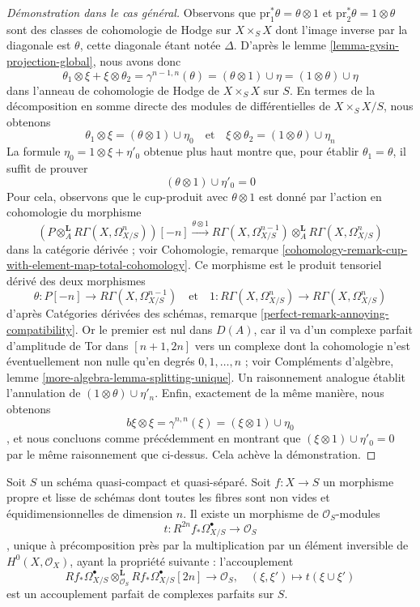 \begin{proof}[Démonstration dans le cas général]
\medskip\noindent
Observons que $\text{pr}_1^*\theta = \theta \otimes 1$
et $\text{pr}_2^*\theta = 1 \otimes \theta$ sont des
classes de cohomologie de Hodge sur
$X \times_S X$ dont l'image inverse par la diagonale est $\theta$, cette diagonale étant notée $\Delta$.
D'après le lemme \ref{lemma-gysin-projection-global}, nous avons donc
$$
\theta_1 \otimes \xi + \xi \otimes \theta_2 =
\gamma^{n - 1, n}(\theta) =
(\theta \otimes 1) \cup \eta =
(1 \otimes \theta) \cup \eta
$$
dans l'anneau de cohomologie de Hodge de $X \times_S X$ sur $S$.
En termes de la décomposition en somme directe des modules
de différentielles de $X \times_S X/S$, nous obtenons
$$
\theta_1 \otimes \xi =
(\theta \otimes 1) \cup \eta_0
\quad\text{et}\quad
\xi \otimes \theta_2 =
(1 \otimes \theta) \cup \eta_n
$$
La formule $\eta_0 = 1 \otimes \xi + \eta'_0$ obtenue plus haut
montre que, pour établir $\theta_1 = \theta$, il suffit de prouver
$$
(\theta \otimes 1) \cup \eta'_0 = 0
$$
Pour cela, observons que le cup-produit avec $\theta \otimes 1$ est donné
par l'action en cohomologie du morphisme
$$
(P \otimes_A^\mathbf{L} R\Gamma(X, \Omega^n_{X/S}))[-n]
\xrightarrow{\theta \otimes 1}
R\Gamma(X, \Omega^{n - 1}_{X/S}) \otimes_A^\mathbf{L}
R\Gamma(X, \Omega^n_{X/S})
$$
dans la catégorie dérivée ; voir Cohomologie, remarque
\ref{cohomology-remark-cup-with-element-map-total-cohomology}.
Ce morphisme est le produit tensoriel dérivé des deux morphismes
$$
\theta : P[-n] \to R\Gamma(X, \Omega^{n - 1}_{X/S})
\quad\text{et}\quad
1 : R\Gamma(X, \Omega^n_{X/S}) \to R\Gamma(X, \Omega^n_{X/S})
$$
d'après Catégories dérivées des schémas, remarque
\ref{perfect-remark-annoying-compatibility}.
Or le premier est nul dans $D(A)$, car il va
d'un complexe parfait d'amplitude de Tor dans $[n + 1, 2n]$ vers un complexe
dont la cohomologie n'est éventuellement non nulle qu'en degrés $0, 1, \ldots, n$ ; voir
Compléments d'algèbre, lemme \ref{more-algebra-lemma-splitting-unique}.
Un raisonnement analogue établit l'annulation de
$(1 \otimes \theta) \cup \eta'_n$. Enfin,
exactement de la même manière, nous obtenons
$$
b \xi \otimes \xi = \gamma^{n, n}(\xi) = (\xi \otimes 1) \cup \eta_0
$$,
et nous concluons comme précédemment en montrant que
$(\xi \otimes 1) \cup \eta'_0 = 0$ par le même raisonnement que ci-dessus.
Cela achève la démonstration.
\end{proof}

\begin{proposition}
\label{proposition-relative-poincare-duality}
Soit $S$ un schéma quasi-compact et quasi-séparé. Soit $f : X \to S$
un morphisme propre et lisse de schémas dont toutes les fibres sont non vides
et équidimensionnelles de dimension $n$. Il existe un morphisme de
$\mathcal{O}_S$-modules
$$
t : R^{2n}f_*\Omega^\bullet_{X/S} \longrightarrow \mathcal{O}_S
$$,
unique à précomposition près par la multiplication par un élément inversible de
$H^0(X, \mathcal{O}_X)$, ayant la propriété suivante : l'accouplement
$$
Rf_*\Omega^\bullet_{X/S}
\otimes_{\mathcal{O}_S}^\mathbf{L}
Rf_*\Omega^\bullet_{X/S}[2n]
\longrightarrow
\mathcal{O}_S, \quad
(\xi, \xi') \longmapsto t(\xi \cup \xi')
$$
est un accouplement parfait de complexes parfaits sur $S$.
\end{proposition}

